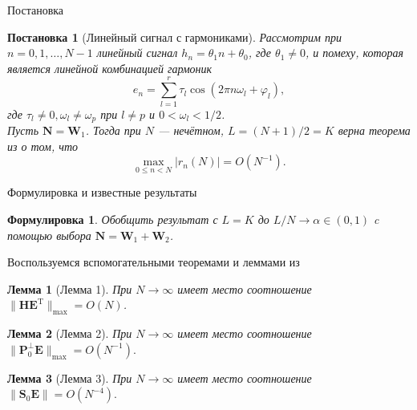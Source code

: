 \documentclass[notheorems, handout]{beamer}
\newtheorem{lemma}{Лемма}
\newtheorem{formulation}{Формулировка}
\newtheorem{statement}{Постановка}
\begin{document}
	\begin{frame}{Постановка}
		\begin{statement}[Линейный сигнал с гармониками]
			Рассмотрим при $n=0,1,\dots,N-1$ линейный сигнал $h_n = \theta_1n+\theta_0$, где $\theta_1 \neq 0$, и помеху, которая является линейной комбинацией гармоник
			\begin{equation*}
				e_n = \sum^r_{l=1}\tau_l\cos(2\pi n\omega_l + \varphi_l),
			\end{equation*} 
			\emph{где} $\tau_l\neq0, \omega_l \neq \omega_p$ \emph{при} $l\neq p$ и $0 < \omega_l < 1/2$.
			\\
			Пусть $\mathbf{N} = \mathbf{W}_1$. Тогда при $N$ --- нечётном, $L=(N+1)/2=K$ верна теорема из \cite{ZNekrutkin} о том, что
			\begin{equation*}
				\max_{0\leqslant n<N}|r_n(N)|=O(N^{-1}).
			\end{equation*}
		\end{statement}
	\end{frame}
		\begin{frame}{Формулировка и известные результаты}
			\begin{formulation}
				\emph{Обобщить результат \cite{ZNekrutkin} с $L=K$ до $L/N\to \alpha \in (0,1)$ c помощью выбора $\mathbf{N}=\mathbf{W}_1+\mathbf{W}_2$}.
			\end{formulation}
			Воспользуемся вспомогательными теоремами и леммами из \cite{ZNekrutkin}
			\begin{lemma}[Лемма 1]\label{lem:2}
				При $N\rightarrow\infty$ имеет место соотношение $\|\mathbf{HE}^\mathrm{T}\|_{\max} = O(N)$.
			\end{lemma}
			\begin{lemma}[Лемма 2]
				При $N\rightarrow\infty$ имеет место соотношение $\|\mathbf{P}_0^{\bot}\mathbf{E}\|_{\max} = O(N^{-1}).$
			\end{lemma}
			\begin{lemma}[Лемма 3]
				При $N\rightarrow\infty$ имеет место соотношение $\|\mathbf{S}_0\mathbf{E}\|=O(N^{-4}).$
			\end{lemma}
	\end{frame}
\end{document}
